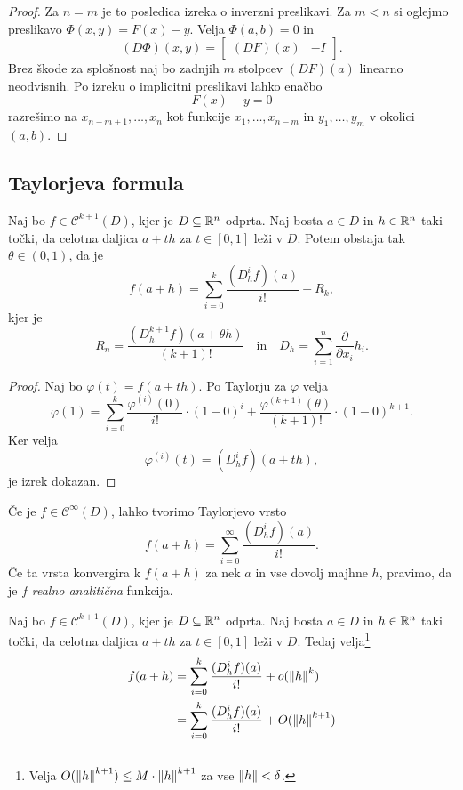 \begin{proof}
Za $n=m$ je to posledica izreka o inverzni preslikavi. Za $m < n$
si oglejmo preslikavo $\Phi(x,y) = F(x) - y$. Velja $\Phi(a,b)=0$
in
\[
(D\Phi)(x,y) =
\begin{bmatrix}
(DF)(x) & -I
\end{bmatrix}.
\]
Brez škode za splošnost naj bo zadnjih $m$ stolpcev $(DF)(a)$
linearno neodvisnih. Po izreku o implicitni preslikavi lahko enačbo
\[
F(x) - y = 0
\]
razrešimo na $x_{n-m+1},\dots,x_n$ kot funkcije $x_1,\dots,x_{n-m}$
in $y_1,\dots,y_m$ v okolici $(a,b)$.
\end{proof}

\newpage

\subsection{Taylorjeva formula}

\begin{izrek}
Naj bo $f \in \mathcal{C}^{k+1}(D)$, kjer je $D \subseteq \mathbb{R}^n$
odprta. Naj bosta $a \in D$ in $h \in \mathbb{R}^n$ taki točki, da celotna
daljica $a+th$ za $t \in [0,1]$ leži v $D$. Potem obstaja tak
$\theta \in (0,1)$, da je
\[
f(a+h) = \sum_{i=0}^k \frac{(D_h^if)(a)}{i!} + R_k,
\]
kjer je
\[
R_n = \frac{(D_h^{k+1}f)(a + \theta h)}{(k+1)!}
\quad \text{in} \quad
D_h = \sum_{i=1}^n \frac{\partial}{\partial x_i} h_i.
\]
\end{izrek}

\begin{proof}
Naj bo $\varphi(t) = f(a + th)$. Po Taylorju za $\varphi$ velja
\[
\varphi(1) = \sum_{i=0}^k \frac{\varphi^{(i)}(0)}{i!} \cdot(1-0)^i
+ \frac{\varphi^{(k+1)}(\theta)}{(k+1)!} \cdot (1-0)^{k+1}.
\]
Ker velja
\[
\varphi^{(i)}(t) = (D_h^if)(a+th),
\]
je izrek dokazan.
\end{proof}

\begin{opomba}
Če je $f \in \mathcal{C}^\infty(D)$, lahko tvorimo Taylorjevo vrsto
\[
f(a+h) = \sum_{i=0}^\infty \frac{(D_h^if)(a)}{i!}.
\]
Če ta vrsta konvergira k $f(a+h)$ za nek $a$ in vse dovolj majhne
$h$, pravimo, da je $f$
\emph{realno analitična} funkcija.
\end{opomba}

\begin{posledica}
Naj bo $f \in \mathcal{C}^{k+1}(D)$, kjer je $D \subseteq \mathbb{R}^n$
odprta. Naj bosta $a \in D$ in $h \in \mathbb{R}^n$ taki točki, da celotna
daljica $a+th$ za $t \in [0,1]$ leži v $D$. Tedaj velja\footnote{
Velja $O(\left\lVert h\right\rVert^{k+1}) \leq M \cdot \left\lVert h\right\rVert^{k+1}$ za vse
$\left\lVert h\right\rVert < \delta$.}
\begin{align*}
f(a+h) &= \sum_{i=0}^k \frac{(D_h^if)(a)}{i!} + o(\left\lVert h\right\rVert^k)
\\
&= \sum_{i=0}^k \frac{(D_h^if)(a)}{i!} + O(\left\lVert h\right\rVert^{k+1})
\end{align*}
\end{posledica}

